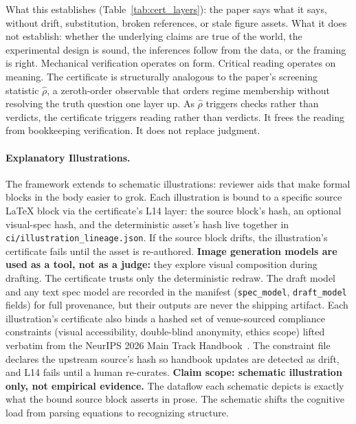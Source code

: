 \documentclass{article}
\theoremstyle{plain}
\theoremstyle{definition}
\theoremstyle{remark}
\newcommand{\rhohat}{\hat{\rho}}
\begin{document}
What this establishes (Table~\ref{tab:cert_layers}): the paper says what it says, without drift, substitution, broken references, or stale figure assets. What it does not establish: whether the underlying claims are true of the world, the experimental design is sound, the inferences follow from the data, or the framing is right. Mechanical verification operates on form. Critical reading operates on meaning. The certificate is structurally analogous to the paper's screening statistic $\rhohat$, a zeroth-order observable that orders regime membership without resolving the truth question one layer up. As $\rhohat$ triggers checks rather than verdicts, the certificate triggers reading rather than verdicts. It frees the reading from bookkeeping verification. It does not replace judgment.

\paragraph{Explanatory Illustrations.}\label{app:illustrations}
The framework extends to schematic illustrations: reviewer aids that make formal blocks in the body easier to grok. Each illustration is bound to a specific source LaTeX block via the certificate's L14 layer: the source block's hash, an optional visual-spec hash, and the deterministic asset's hash live together in \texttt{ci/illustration\_lineage.json}. If the source block drifts, the illustration's certificate fails until the asset is re-authored. \textbf{Image generation models are used as a tool, not as a judge:} they explore visual composition during drafting. The certificate trusts only the deterministic redraw. The draft model and any text spec model are recorded in the manifest (\texttt{spec\_model}, \texttt{draft\_model} fields) for full provenance, but their outputs are never the shipping artifact. Each illustration's certificate also binds a hashed set of venue-sourced compliance constraints (visual accessibility, double-blind anonymity, ethics scope) lifted verbatim from the NeurIPS 2026 Main Track Handbook~\cite{neurips2026handbook}. The constraint file declares the upstream source's hash so handbook updates are detected as drift, and L14 fails until a human re-curates. \textbf{Claim scope: schematic illustration only, not empirical evidence.} The dataflow each schematic depicts is exactly what the bound source block asserts in prose. The schematic shifts the cognitive load from parsing equations to recognizing structure.


\end{document}
